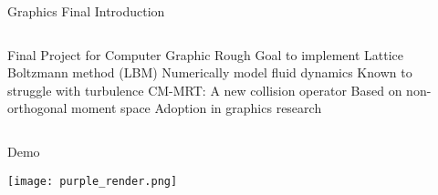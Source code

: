 \placelogofalse
\begin{frame}{Graphics Final Introduction}
\begin{columns}
\centering
\begin{outline}
  \1 Final Project for Computer Graphic 
  \2 Rough Goal to implement \cite{Li2020, Lyu2021}
  \1 Lattice Boltzmann method (LBM) 
  \2 Numerically model fluid dynamics
  \2 Known to struggle with turbulence
  \1 CM-MRT: A new collision operator
  \2 Based on non-orthogonal moment space \cite{De2019}
  \2 Adoption in graphics research \cite{Li2018, Li2020, Li2024, Lyu2021}
\end{outline}

\begin{center}
\centering
{}

\end{center}
\end{columns}
\end{frame}
\placelogotrue

\placelogofalse
\begin{frame}{Demo}
  \begin{center}
  \centering
  \texttt{[image: purple\_render.png]}
  \end{center}
\end{frame}
\placelogotrue
